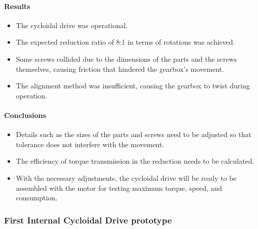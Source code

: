 \documentclass{article}
\begin{document}
\paragraph[short]{Results}
\begin{itemize}
    \item The cycloidal drive was operational.
    \item The expected reduction ratio of 8:1 in terms of rotations was achieved.
    \item Some screws collided due to the dimensions of the parts and the screws themselves, causing friction that hindered the gearbox's movement.
    \item The alignment method was insufficient, causing the gearbox to twist during operation.
\end{itemize}

\paragraph[short]{Conclusions}
\begin{itemize}
    \item Details such as the sizes of the parts and screws need to be adjusted so that tolerance does not interfere with the movement.
    \item The efficiency of torque transmission in the reduction needs to be calculated.
    \item With the necessary adjustments, the cycloidal drive will be ready to be assembled with the motor for testing maximum torque, speed, and consumption.
\end{itemize}

\subsubsection{First \textbf{Internal} Cycloidal Drive prototype}
\end{document}
